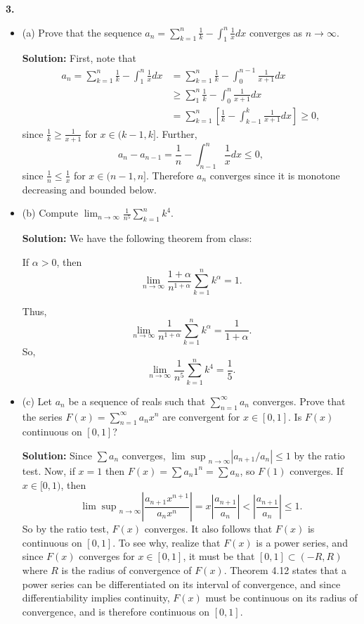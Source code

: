 \documentclass[12pt]{article}
\begin{document}
{\bf 3.}
\begin{itemize}[label={},leftmargin=4mm, itemsep=1em, parsep=1em]
  \item (a) Prove that the sequence $a_{n} = \sum_{k=1}^{n}\frac{1}{k} -
    \int_{1}^{n}\frac{1}{x}dx$ converges as $n\rightarrow \infty$.

  {\bf Solution:} First, note that 
  \begin{align*}
    a_{n} = \sum_{k=1}^{n}\frac{1}{k} - \int_{1}^{n}\frac{1}{x}dx & =
    \sum_{k=1}^{n}\frac{1}{k} - \int_{0}^{n-1}\frac{1}{x+1}dx \\
    & \geq \sum_{1}^{n}\frac{1}{k} - \int_{0}^{n}\frac{1}{x+1}dx \\
    & = \sum_{k=1}^{n}\left[ \frac{1}{k} - \int_{k-1}^{k}\frac{1}{x+1}dx\right]
    \geq 0,
  \end{align*}
  since $\frac{1}{k} \geq \frac{1}{x+1}$ for $x \in (k-1, k]$. Further, 
  \[ a_{n} - a_{n-1} = \frac{1}{n} - \int_{n-1}^{n}\frac{1}{x}dx \leq 0, \]
  since $\frac{1}{n} \leq \frac{1}{x}$ for $x\in(n-1,n]$. Therefore $a_{n}$
  converges since it is monotone decreasing and bounded below.

\item (b) Compute $\lim_{n\rightarrow\infty}\frac{1}{n^{5}}\sum_{k=1}^{n}k^{4}$.
    
  {\bf Solution:} We have the following theorem from class:
  
  \begin{Theorem}
    If $\alpha > 0$, then 
    \[ \lim_{n\rightarrow \infty} \frac{1+\alpha}{n^{1+\alpha}}\sum_{k=1}^{n}k^{\alpha} = 1.\]
  \end{Theorem}

  Thus,
  \[ \lim_{n\rightarrow \infty}\frac{1}{n^{1+\alpha}}\sum_{k=1}^{n}k^{\alpha} =
  \frac{1}{1+\alpha}. \]
  So,
  \[ \lim_{n\rightarrow \infty}\frac{1}{n^{5}}\sum_{k=1}^{n}k^{4} = \frac{1}{5}.
  \]

  \item (c) Let $a_{n}$ be a sequence of reals such that
  $\sum_{n=1}^{\infty}a_{n}$ converges. Prove that the series $F(x) =
  \sum_{n=1}^{\infty}a_{n}x^{n}$ are convergent for $x \in [0,1]$. Is $F(x)$
  continuous on $[0,1]$? 

  {\bf Solution:} Since $\sum a_{n}$ converges,
  ${\lim\sup}_{n\rightarrow\infty}|a_{n+1}/a_{n}| \leq 1$ by the ratio test.
  Now, if $x = 1$ then $F(x) = \sum a_{n}1^{n} = \sum a_{n}$, so $F(1)$
  converges. If $x \in [0,1)$, then 
  \[
    {\lim\sup}_{n\rightarrow\infty}\left|\frac{a_{n+1}x^{n+1}}{a_{n}x^{n}}\right|
    = x\left|\frac{a_{n+1}}{a_{n}}\right| < \left|\frac{a_{n+1}}{a_{n}}\right|
  \leq 1. \]
  So by the ratio test, $F(x)$ converges. It also follows that $F(x)$ is continuous on
  $[0,1]$. To see why, realize that $F(x)$ is a power series, and since $F(x)$
  converges for $x \in [0,1]$, it must be that $[0,1] \subset (-R, R)$ where $R$
  is the radius of convergence of $F(x)$. Theorem 4.12 states that a power
  series can be differentiated on its interval of convergence, and since
  differentiability implies continuity, $F(x)$ must be continuous on its radius
  of convergence, and is therefore continuous on $[0,1]$.
\end{itemize}
\end{document}
